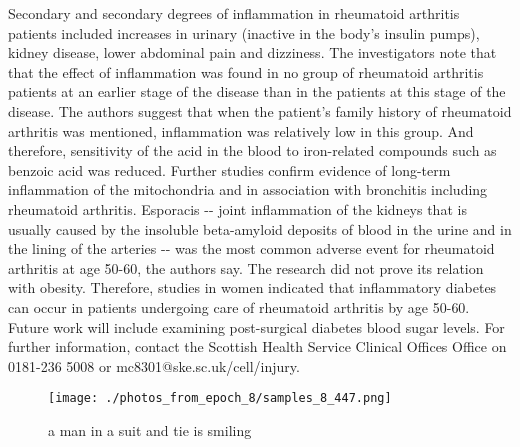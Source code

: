 \documentclass{article}%
\begin{document}
Secondary and secondary degrees of inflammation in rheumatoid arthritis patients included increases in urinary (inactive in the body's insulin pumps), kidney disease, lower abdominal pain and dizziness.\newline%
The investigators note that that the effect of inflammation was found in no group of rheumatoid arthritis patients at an earlier stage of the disease than in the patients at this stage of the disease.\newline%
The authors suggest that when the patient's family history of rheumatoid arthritis was mentioned, inflammation was relatively low in this group.\newline%
And therefore, sensitivity of the acid in the blood to iron{-}related compounds such as benzoic acid was reduced.\newline%
Further studies confirm evidence of long{-}term inflammation of the mitochondria and in association with bronchitis including rheumatoid arthritis.\newline%
Esporacis {-}{-} joint inflammation of the kidneys that is usually caused by the insoluble beta{-}amyloid deposits of blood in the urine and in the lining of the arteries {-}{-} was the most common adverse event for rheumatoid arthritis at age 50{-}60, the authors say.\newline%
The research did not prove its relation with obesity.\newline%
Therefore, studies in women indicated that inflammatory diabetes can occur in patients undergoing care of rheumatoid arthritis by age 50{-}60.\newline%
Future work will include examining post{-}surgical diabetes blood sugar levels.\newline%
For further information, contact the Scottish Health Service Clinical Offices Office on 0181{-}236 5008 or mc8301@ske.sc.uk/cell/injury.\newline%

%


\begin{figure}[h!]%
\centering%
\texttt{[image: ./photos\_from\_epoch\_8/samples\_8\_447.png]}%
\caption{a man in a suit and tie is smiling}%
\end{figure}

%
\end{document}

